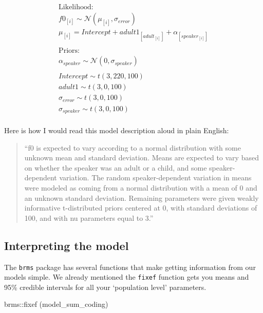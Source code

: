 \documentclass[
]{book}
\newenvironment{Shaded}{\begin{snugshade}}{\end{snugshade}}
\newcommand{\FunctionTok}[1]{\textcolor[rgb]{0.00,0.00,0.00}{#1}}
\newcommand{\NormalTok}[1]{#1}
\newcommand{\SpecialCharTok}[1]{\textcolor[rgb]{0.00,0.00,0.00}{#1}}
\begin{document}
\begin{equation}
\begin{split}
\textrm{Likelihood:} \\
f0_{[i]} \sim \mathcal{N}(\mu_{[i]},\sigma_{error}) \\
\mu_{[i]} = Intercept + adult1_{[adult_{[i]}]} + \alpha_{[speaker_{[i]}]} \\\\
\textrm{Priors:} \\
\alpha_{speaker} \sim \mathcal{N}(0,\sigma_{speaker}) \\ \\ 
Intercept \sim t(3, 220, 100) \\ 
adult1 \sim t(3, 0, 100) \\ 
\sigma_{error} \sim t(3, 0, 100) \\
\sigma_{speaker} \sim t(3, 0, 100) \\ 
\end{split}
\end{equation}

Here is how I would read this model description aloud in plain English:

\begin{quote}
``f0 is expected to vary according to a normal distribution with some unknown mean and standard deviation. Means are expected to vary based on whether the speaker was an adult or a child, and some speaker-dependent variation. The random speaker-dependent variation in means were modeled as coming from a normal distribution with a mean of 0 and an unknown standard deviation. Remaining parameters were given weakly informative t-distributed priors centered at 0, with standard deviations of 100, and with nu parameters equal to 3.''
\end{quote}

\hypertarget{interpreting-the-model-1}{%
\subsection{Interpreting the model}\label{interpreting-the-model-1}}

The \texttt{brms} package has several functions that make getting information from our models simple. We already mentioned the \texttt{fixef} function gets you means and 95\% credible intervals for all your `population level' parameters.

\begin{Shaded}
\begin{Highlighting}[]
\NormalTok{brms}\SpecialCharTok{::}\FunctionTok{fixef}\NormalTok{ (model\_sum\_coding)}
\end{Highlighting}
\end{Shaded}
\end{document}
